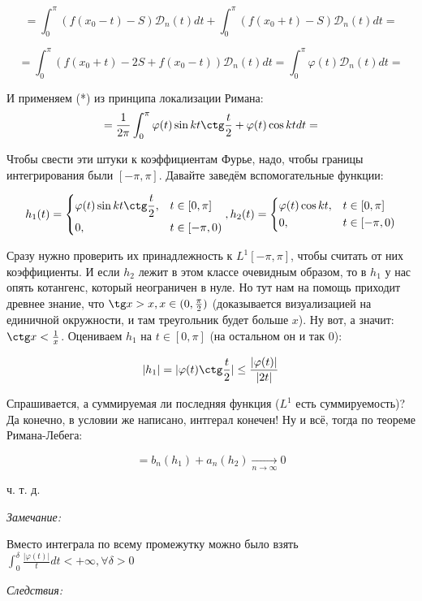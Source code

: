 \documentclass{article}
\def\goesto#1{\underset{#1}{\longrightarrow}}
\def\toinf#1{\goesto{#1 \rightarrow \infty}}
\def\ntoinf{\toinf{n}}
\def\DD{\mathcal{D}}
\begin{document}
\[ = \int_{0}^{\pi}(f(x_0 - t) - S)\DD_n(t) dt + \int_{0}^{\pi} (f(x_0 + t) - S)\DD_n(t) dt = \]

\[ = \int_{0}^{\pi}(f(x_0 + t) - 2S + f(x_0 - t))\DD_n(t) dt = \int_{0}^{\pi} \varphi(t)\DD_n(t)dt = \]

И применяем (*) из принципа локализации Римана:
\[ = \frac{1}{2\pi} \int_{0}^{\pi} \varphi(t) \sin kt \ctg \frac{t}{2} + \varphi(t) \cos kt dt = \]

Чтобы свести эти штуки к коэффициентам Фурье, надо, чтобы границы интегрирования были $[-\pi, \pi]$. Давайте заведём вспомогательные функции:

\[h_1(t) = \begin{dcases}
    \varphi(t)\sin kt \ctg \frac{t}{2}, &t \in [0, \pi] \\
    0, &t \in[-\pi, 0)
\end{dcases}, h_2(t) = \begin{dcases}
    \varphi(t)\cos kt, &t \in [0, \pi] \\
    0, &t \in[-\pi, 0)
\end{dcases}\]

Сразу нужно проверить их принадлежность к $L^1[-\pi, \pi]$, чтобы считать от них коэффициенты. И если $h_2$ лежит в этом классе очевидным образом, то в $h_1$ у нас опять котангенс, который неограничен в нуле. Но тут нам на помощь приходит древнее знание, что $\tg x > x, x \in (0, \frac{\pi}{2})$ (доказывается визуализацией на единичной окружности, и там треугольник будет больше $x$). Ну вот, а значит: $\ctg x < \frac{1}{x}$. Оцениваем $h_1$ на $t \in [0, \pi]$ (на остальном он и так 0):

\[|h_1| = |\varphi(t)\ctg \frac{t}{2}| \le \frac{|\varphi(t)|}{|2t|}\]

Спрашивается, а суммируемая ли последняя функция ($L^1$ есть суммируемость)? Да конечно, в условии же написано, интгерал конечен! Ну и всё, тогда по теореме Римана-Лебега:

\[ = b_n(h_1) + a_n(h_2) \ntoinf 0\]

ч. т. д. 

\textit{Замечание:}

Вместо интеграла по всему промежутку можно было взять $\int_0^\delta \frac{|\varphi(t)|}{t} dt < + \infty, \forall \delta > 0$

\textit{Следствия:}
\end{document}
